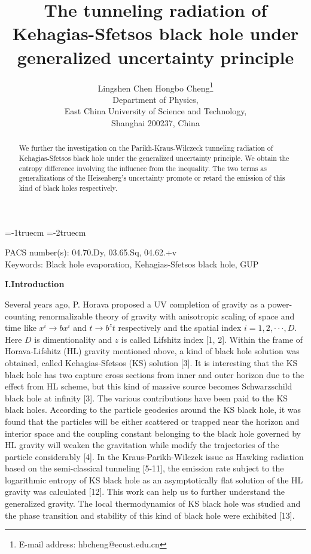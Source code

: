 \documentclass[graphicx, 12pt]{article}
\begin{document}
\small
\hoffset=-1truecm
\voffset=-2truecm
\title{\bf The tunneling radiation of Kehagias-Sfetsos black hole
under generalized uncertainty principle}

\author{Lingshen Chen\hspace {1cm} Hongbo Cheng\footnote
{E-mail address: hbcheng@ecust.edu.cn}\\
Department of Physics,\\ East China University of Science and
Technology,\\ Shanghai 200237, China\\}

\date{}
\maketitle

\begin{abstract}
We further the investigation on the Parikh-Kraus-Wilczeck
tunneling radiation of Kehagias-Sfetsos black hole under the
generalized uncertainty principle. We obtain the entropy
difference involving the influence from the inequality. The two
terms as generalizations of the Heisenberg's uncertainty promote
or retard the emission of this kind of black holes respectively.
\end{abstract}

\vspace{8cm} \hspace{1cm} PACS number(s): 04.70.Dy, 03.65.Sq, 04.62.+v\\
Keywords: Black hole evaporation, Kehagias-Sfetsos black hole, GUP

\noindent \textbf{I.\hspace{0.4cm}Introduction}

Several years ago, P. Horava proposed a UV completion of gravity
as a power-counting renormalizable theory of gravity with
anisotropic scaling of space and time like $x^{i}\longrightarrow
bx^{i}$ and $t\longrightarrow b^{z}t$ respectively and the spatial
index $i=1, 2, \cdot\cdot\cdot, D$. Here $D$ is dimentionality and
$z$ is called Lifshitz index [1, 2]. Within the frame of
Horava-Lifshitz (HL) gravity mentioned above, a kind of black hole
solution was obtained, called Kehagias-Sfetsos (KS) solution [3].
It is interesting that the KS black hole has two capture cross
sections from inner and outer horizon due to the effect from HL
scheme, but this kind of massive source becomes Schwarzschild
black hole at infinity [3]. The various contributions have been
paid to the KS black holes. According to the particle geodesics
around the KS black hole, it was found that the particles will be
either scattered or trapped near the horizon and interior space
and the coupling constant belonging to the black hole governed by
HL gravity will weaken the gravitation while modify the
trajectories of the particle considerably [4]. In the
Kraus-Parikh-Wilczek issue as Hawking radiation based on the
semi-classical tunneling [5-11], the emission rate subject to the
logarithmic entropy of KS black hole as an asymptotically flat
solution of the HL gravity was calculated [12]. This work can help
us to further understand the generalized gravity. The local
thermodynamics of KS black hole was studied and the phase
transition and stability of this kind of black hole were exhibited
[13].
\end{document}

